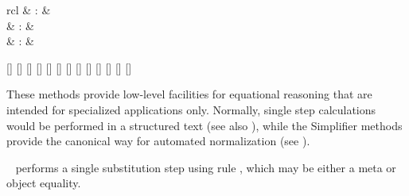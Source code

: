 \begin{isabellebody}
\begin{isamarkuptext}
\begin{description}
  \end{description}%
\end{isamarkuptext}%
\isamarkuptrue%
%
\isamarkuptrue%
%
\begin{isamarkuptext}%
\begin{matharray}{rcl}
    \hypertarget{method.subst}{\hyperlink{method.subst}{\mbox{}}} & : &  \\
    \hypertarget{method.hypsubst}{\hyperlink{method.hypsubst}{\mbox{}}} & : &  \\
    \hypertarget{method.split}{\hyperlink{method.split}{\mbox{}}} & : &  \\
  \end{matharray}

  \begin{railoutput}
[]
\rail@bar
{}
[]
[]
[]
\rail@endbar
{}
\rail@bar
{}
[]
\rail@plus
{}[]
\rail@endplus
{}[]
\rail@endbar
{}[]
\rail@end
{}
[]
\rail@bar
{}
[]
[]
[]
\rail@endbar
{}[]
\rail@end
\end{railoutput}


  These methods provide low-level facilities for equational reasoning
  that are intended for specialized applications only.  Normally,
  single step calculations would be performed in a structured text
  (see also ), while the Simplifier methods
  provide the canonical way for automated normalization (see
  ).

  \begin{description}

  \item \hyperlink{method.subst}{\mbox{}}~ performs a single substitution step
  using rule , which may be either a meta or object
  equality.


\end{description}
\end{isamarkuptext}
\end{isabellebody}
